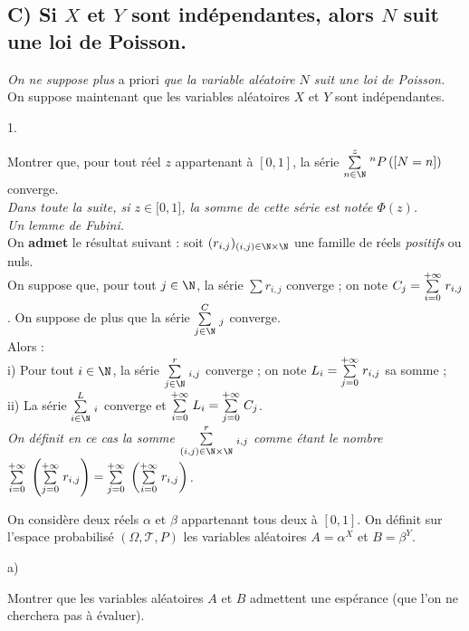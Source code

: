 \documentclass[11pt]{article}%
\begin{document}
\subsection*{C) Si $X$ et $Y$ sont indépendantes, alors $N$ suit une
loi de
Poisson.}

\textsl{On ne suppose plus} a priori \textsl{que la variable aléatoire
$N$
suit une loi de Poisson.} On suppose maintenant que les variables
aléatoires $X$ et $Y$ sont indépendantes.

\begin{noliste}{1.}
 \setlength{\itemsep}{4mm}
\item Montrer que, pour tout réel $z$ appartenant à $[0,1]$, la série
$\Sum{n\in \N}z^{n}P\left(\Ev{N = n}\right)$ converge.\\
\textsl{Dans toute la suite, si $z\in \lbrack 0,1]$, la somme de cette
série
est notée $\Phi (z)$.}\\
\textsl{Un lemme de Fubini.} \\
On \textbf{admet} le résultat suivant : soit $(r_{i,j})_{(i,j)\in
\N\times \N}$ une famille de réels \textsl{positifs} ou nuls.\\
On suppose que, pour tout $j\in \N$, la série $\sum r_{i,j}$
converge ; on note $C_{j} = {\textstyle\sum\limits_{i = 0}^{+ \infty }}\hspace{.1cm}r_{i,j}$. On suppose
de plus que la série $\Sum{j\in \N}C_{j}$ converge.\\
Alors :\\
\quad i) Pour tout $i\in \N$, la série $\Sum{j\in \N}r_{i,j}$ converge
; on note $L_{i} = {\textstyle\sum\limits_{j = 0}^{+ \infty }}\hspace{.1cm}r_{i,j}$ sa
somme ;\\
{}\quad ii) La série $\Sum{i\in \N}L_{i}$ converge et ${\textstyle\sum\limits_{i = 0}^{+
\infty }}\hspace{.1cm}L_{i} = {\textstyle\sum\limits_{j = 0}^{+ \infty }}\hspace{.1cm}C_{j}$.\\
\textsl{On définit en ce cas la somme $\Sum{(i,j)\in \N\times
\N}r_{i,j}$ comme étant le nombre ${\textstyle\sum\limits_{i = 0}^{+ \infty
}}\hspace{.1cm}\left( {\textstyle\sum\limits_{j = 0}^{+ \infty }}\hspace{.1cm}r_{i,j}\right)
 = {\textstyle\sum\limits_{j = 0}^{+ \infty }}\hspace{.1cm}\left( {\textstyle\sum\limits_{i = 0}^{+ \infty
}}\hspace{.1cm}r_{i,j}\right) $.}

\item On considère deux réels $\alpha $ et $\beta $ appartenant tous
deux à $[0,1]$. On définit sur l'espace probabilisé
$(\Omega,\mathcal{T},P)$ les
variables aléatoires $A = \alpha ^{X}$ et $B = \beta ^{Y}$.

\begin{noliste}{a)}
 \setlength{\itemsep}{2mm}
\item Montrer que les variables aléatoires $A$ et $B$ admettent une
espérance (que l'on ne cherchera pas à évaluer).


\end{noliste}
\end{noliste}
\end{document}
